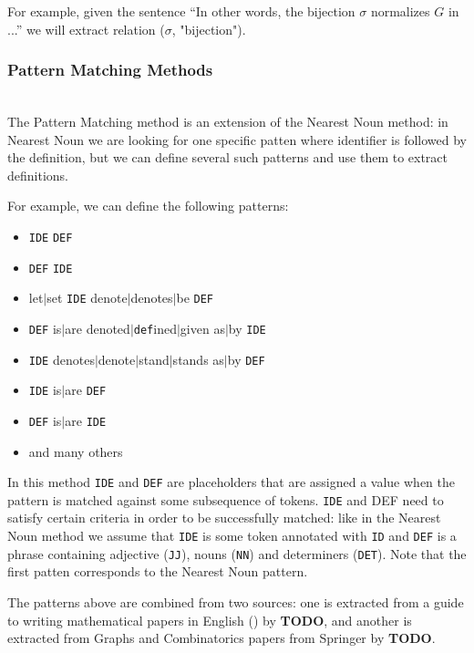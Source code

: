 For example, given the sentence ``In other words, the bijection $\sigma$ normalizes
$G$ in ...'' we will extract relation ($\sigma$, "bijection").



\subsubsection{Pattern Matching Methods} \label{sec:pattern-matching}

\ \\

The Pattern Matching method \cite{quoc2010mining} is an extension of the 
Nearest Noun method: in Nearest Noun we are looking for one specific patten 
where identifier is followed by the definition, but we can define several such 
patterns and use them to extract definitions. 

For example, we can define the following patterns:

\begin{itemize}
\itemsep1pt\parskip0pt
  \item \texttt{IDE} \texttt{DEF}
  \item \texttt{DEF} \texttt{IDE}
  \item let$|$set \texttt{IDE} denote$|$denotes$|$be \texttt{DEF}
  \item \texttt{DEF} is$|$are denoted$|$\texttt{def}ined$|$given as$|$by \texttt{IDE}
  \item \texttt{IDE} denotes$|$denote$|$stand$|$stands as$|$by \texttt{DEF}
  \item \texttt{IDE} is$|$are \texttt{DEF}
  \item \texttt{DEF} is$|$are \texttt{IDE}
  \item and many others
\end{itemize}


In this method \texttt{IDE} and \texttt{DEF} are placeholders that are 
assigned a value when the pattern is matched against some subsequence 
of tokens.  \texttt{IDE} and DEF need to 
satisfy certain criteria in order to be successfully matched: like in the 
Nearest Noun method we assume that \texttt{IDE} is some token annotated with 
\texttt{ID} and \texttt{DEF} is a phrase containing adjective (\texttt{JJ}), 
nouns (\texttt{NN}) and  determiners (\texttt{DET}). Note that the first patten corresponds 
to the Nearest Noun pattern.

The patterns above are combined from two sources: one 
is extracted from a guide to writing mathematical papers in English 
(\cite{trzeciak1995writing}) by \textbf{TODO}, and another 
is extracted from Graphs and Combinatorics papers from Springer 
by \textbf{TODO}. 


